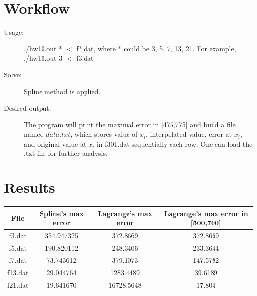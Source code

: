 \documentclass[12pt,a4paper]{article}
\begin{document}
\section{Workflow}

\begin{description}  

\item [Usage:] ./hw10.out  * $<$ f*.dat, where * could be 3, 5, 7, 13, 21. For example,  ./hw10.out  3 $<$ f3.dat
\item [Solve:] Spline method is applied.
\item[Desired output:] The program will print the maximal error in [475,775] and build a file named $data.txt$, which stores value of $x_i$, interpolated value, error at $x_i$, and original value at $x_i$ in f301.dat sequentially each row. One can load the .txt file for further analysis.
\end{description}

\section{Results}
  \begin{center}
    \begin{tabular}{|c|c|c|c|}
    \hline  File & Spline's max error & Lagrange's max error&  Lagrange's max error in [500,700]\\
    \hline  f3.dat	&354.947325		&372.8669    	&372.8669	\\
    \hline  f5.dat	&190.820112		&248.3406    	&233.3644	\\
    \hline  f7.dat	&73.743612		&379.1073    	&147.5782	\\
    \hline  f13.dat	&29.044764		&1283.4489 	&39.6189	\\
    \hline  f21.dat	&19.641670		&16728.5648	& 17.804	\\\hline
 \end{tabular}

 \end{center}
\end{document}
